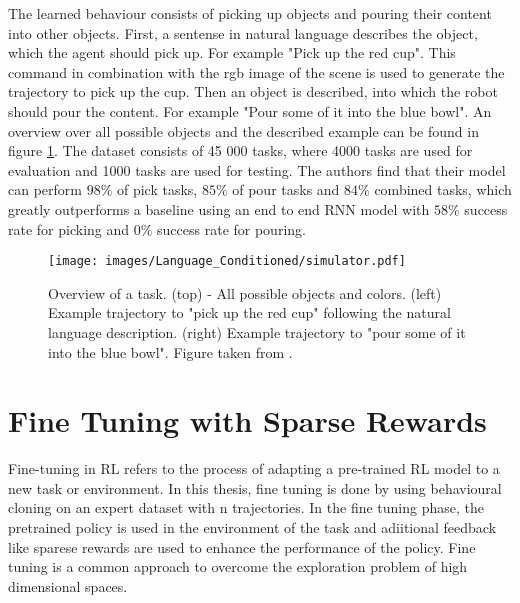 The learned behaviour consists of picking up objects and pouring their content into other objects. First, a sentense in natural language describes the object, which 
the agent should pick up. For example "Pick up the red cup". This command in combination with the rgb image of the scene is used to generate the trajectory to 
pick up the cup. Then an object is described, into which the robot should pour the content. For example "Pour some of it into the blue bowl". An overview over 
all possible objects and the described example can be found in figure \ref{lang_imi_expl}. The dataset consists of 45 000 tasks, where 4000 tasks are used for 
evaluation and 1000 tasks are used for testing. The authors find that their model can perform $98 \%$ of pick tasks, $85 \%$ of pour tasks and $84 \%$ combined 
tasks, which greatly outperforms a baseline using an end to end RNN model with $58\%$ success rate for picking and $0 \%$ success rate for pouring.

\begin{figure}[htbp]
    \centering
    \texttt{[image: images/Language\_Conditioned/simulator.pdf]}
    \caption{Overview of a task. (top) - All possible objects and colors. (left) Example trajectory to "pick up the red cup" following the natural language description. 
    (right) Example trajectory to "pour some of it into the blue bowl". Figure taken from \cite{stepputtis2020languageconditioned}.}
    \label{lang_imi_expl}
\end{figure}

\section{Fine Tuning with Sparse Rewards}
Fine-tuning in RL refers to the process of adapting a pre-trained RL model to a new task or environment. In this thesis, fine tuning is done by using behavioural 
cloning on an expert dataset with n trajectories. In the fine tuning phase, the pretrained policy is used in the environment of the task and adiitional feedback 
like sparese rewards are used to enhance the performance of the policy. Fine tuning is a common approach to overcome the exploration problem of high dimensional 
spaces.
